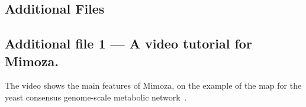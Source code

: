 \documentclass{bmcart}
\begin{document}
\begin{backmatter}

\section*{Additional Files}
  \subsection*{Additional file 1 --- A video tutorial for Mimoza.}
  The video shows the main features of Mimoza, on the example of the map for the yeast consensus genome-scale metabolic network~\cite{Herrgard2008}.


\end{backmatter}
\end{document}
